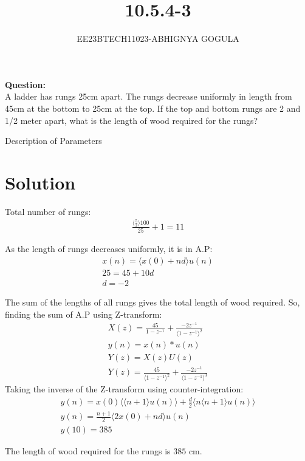 \documentclass[journal,12pt,twocolumn]{IEEEtran}
\newcommand{\brak}[1]{\langle #1 \rangle}
\theoremstyle{remark}
\begin{document}

\vspace{3cm}
\title{\textbf{10.5.4-3}}
\author{EE23BTECH11023-ABHIGNYA GOGULA}
\maketitle
\newpage
\bigskip
\renewcommand{\thefigure}{\theenumi}
\renewcommand{\thetable}{\theenumi}
\textbf{Question:}
\\
 A ladder has rungs 25cm apart. The rungs decrease uniformly in length from 45cm at the bottom to 25cm at the top. If the top and bottom rungs are 2 and 1/2 meter apart, what is the length of wood required for the rungs?

\begin{table}[h]
\centering

\caption{Description of Parameters}
\label{tab:parameter-values}
\end{table}

\section*{Solution}
\fi
Total number of rungs:
\begin{align}
\frac{\brak{\frac{5}{2}}100}{25}+1 = 11
\end{align}

As the length of rungs decreases uniformly, it is in A.P:
\begin{align}
x(n) = \brak{x(0) + nd}u(n) \\
25 = 45 + 10d \\
d = -2
\end{align}

The sum of the lengths of all rungs gives the total length of wood required. So, finding the sum of A.P using Z-transform:
\begin{align}
X(z) = \frac{45}{1-z^{-1}} + \frac{-2z^{-1}}{\brak{1-z^{-1}}^{2}}\\
y(n)=x(n)*u(n)\\
Y(z)=X(z)U(z)\\
Y(z)=\frac{45}{\brak{1-z^{-1}}^2}+ \frac{-2z^{-1}}{\brak{1-z^{-1}}^{3}}
\end{align}
Taking the inverse of the Z-transform using counter-integration:
\begin{align}
y(n) = x(0)\brak{\brak{n+1}u(n)}+\frac{d}{2}\brak{n\brak{n+1}u(n)} \\
y(n) = \frac{n+1}{2}\brak{2x(0)+nd}u(n) \\
y(10) = 385
\end{align}

The length of wood required for the rungs is $385$ cm.
\end{document}
